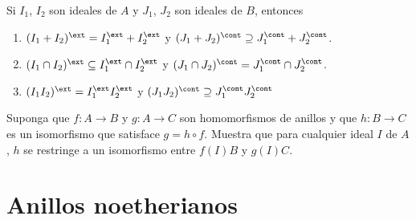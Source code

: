 \ExerciseSection

\begin{exerciseList}
  \item Si $I_1$, $I_2$ son ideales de $A$ y $J_1$, $J_2$ son ideales de $B$, entonces
    \begin{enumerate}
      \item $(I_1+I_2)^\ext = I_1^\ext + I_2^\ext$ y $(J_1+J_2)^\cont \supseteq J_1^\cont + J_2^\cont$.
      \item $(I_1 \cap I_2)^\ext \subseteq I_1^\ext \cap I_2^\ext$ y $(J_1 \cap J_2)^\cont = J_1^\cont \cap J_2^\cont$.
      \item $(I_1 I_2)^\ext = I_1^\ext I_2^\ext$ y $(J_1 J_2)^\cont \supseteq J_1^\cont J_2^\cont$
    \end{enumerate}

  \item Suponga que $f\colon A \to B $ y $g\colon A \to C$ son homomorfismos de anillos y que $h\colon B \to C$ es un isomorfismo que satisface $g = h \circ f$. Muestra que para cualquier ideal $I$ de $A$, $h$ se restringe a un isomorfismo entre $f(I)B$ y $g(I)C$.
\end{exerciseList}




\section{Anillos noetherianos}

